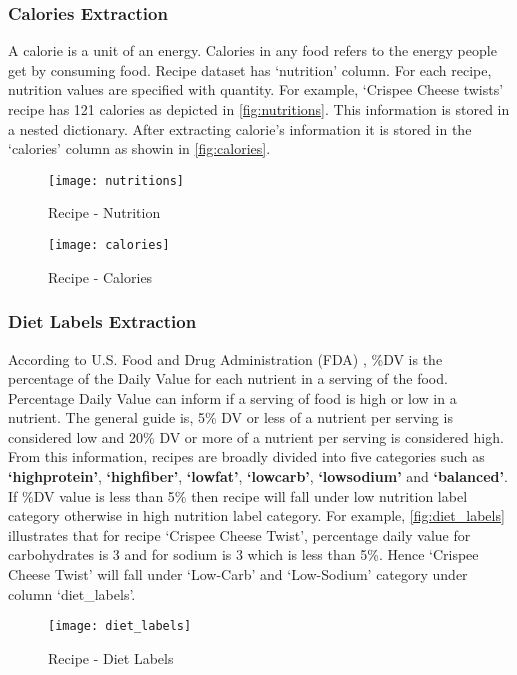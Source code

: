 \subsubsection{Calories Extraction}
A calorie is a unit of an energy. Calories in any food refers to the energy people get by consuming food. Recipe dataset has `nutrition' column. For each recipe, nutrition values are specified with quantity. For example, `Crispee Cheese twists' recipe has 121 calories as depicted in  \autoref{fig:nutritions}. This information is stored in a nested dictionary. After extracting calorie's information it is stored in the `calories' column as showin in \autoref{fig:calories}.
\begin{singlespace}
\begin{figure}[H]
	\centering
	\texttt{[image: nutritions]}
	\caption{Recipe - Nutrition }
	\label{fig:nutritions}
\end{figure}  
\end{singlespace}
\begin{singlespace}
\begin{figure}[H]
	\centering
	\texttt{[image: calories]}
	\caption{Recipe - Calories }
	\label{fig:calories}
\end{figure}  
\end{singlespace}

\subsubsection{Diet Labels Extraction}
\label{sec:diet_labels}
According to U.S. Food and Drug Administration (FDA) \cite{51}, \%DV is the percentage of the Daily Value for each nutrient in a serving of the food. Percentage Daily Value can inform if a serving of food is high or low in a nutrient. The general guide is, 5\% DV or less of a nutrient per serving is considered low and 20\% DV or more of a nutrient per serving is considered high. From this information, recipes are broadly divided into five categories such as \textbf{`highprotein'}, \textbf{`highfiber'}, \textbf{`lowfat'}, \textbf{`lowcarb'}, \textbf{`lowsodium'} and \textbf{`balanced'}. If \%DV value is less than 5\% then recipe will fall under low nutrition label category otherwise in high nutrition label category. For example, \autoref{fig:diet_labels} illustrates that for recipe `Crispee Cheese Twist', percentage daily value for carbohydrates is $3$ and for sodium is $3$ which is less than 5\%. Hence `Crispee Cheese Twist' will fall under `Low-Carb' and `Low-Sodium' category under column `diet\_labels'.
\begin{singlespace}
\begin{figure}[H]
	\centering
	\texttt{[image: diet\_labels]}
	\caption{Recipe - Diet Labels }
	\label{fig:diet_labels}
\end{figure}  
\end{singlespace}

